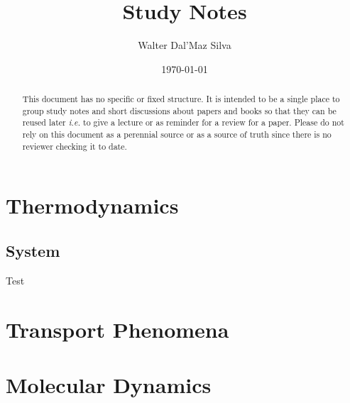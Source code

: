 \documentclass[12pt]{paper}
\title{Study Notes}
\author{Walter Dal'Maz Silva}
\date{\today}
\begin{document}
\maketitle%
\tableofcontents%

\begin{abstract}
This document has no specific or fixed structure. It is intended to be a single place to group study notes and short discussions about papers and books so that they can be reused later \emph{i.e.} to give a lecture or as reminder for a review for a paper. Please do not rely on this document as a perennial source or as a source of truth since there is no reviewer checking it to date.
\end{abstract}

\section{Thermodynamics}

\subsection{System }

Test~\cite{Huang1995}

\section{Transport Phenomena}

\section{Molecular Dynamics}


\printbibliography%
\end{document}
